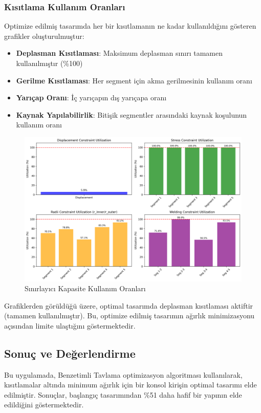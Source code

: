 \subsubsection{Kısıtlama Kullanım Oranları}
Optimize edilmiş tasarımda her bir kısıtlamanın ne kadar kullanıldığını gösteren grafikler oluşturulmuştur:

\begin{itemize}
    \item \textbf{Deplasman Kısıtlaması}: Maksimum deplasman sınırı tamamen kullanılmıştır (\%100)
    \item \textbf{Gerilme Kısıtlaması}: Her segment için akma gerilmesinin kullanım oranı
    \item \textbf{Yarıçap Oranı}: İç yarıçapın dış yarıçapa oranı
    \item \textbf{Kaynak Yapılabilirlik}: Bitişik segmentler arasındaki kaynak koşulunun kullanım oranı
\end{itemize}

\begin{figure}[H]
    \centering
    \includegraphics[width=1\textwidth]{weeks_new/imgs/constraint_utilization.png}
    \caption{Sınırlayıcı Kapasite Kullanım Oranları}
    \label{fig:constraint_utilization}
\end{figure}

Grafiklerden görüldüğü üzere, optimal tasarımda deplasman kısıtlaması aktiftir (tamamen kullanılmıştır). Bu, optimize edilmiş tasarımın ağırlık minimizasyonu açısından limite ulaştığını göstermektedir.

\subsection{Sonuç ve Değerlendirme}
Bu uygulamada, Benzetimli Tavlama optimizasyon algoritması kullanılarak, kısıtlamalar altında minimum ağırlık için bir konsol kirişin optimal tasarımı elde edilmiştir. Sonuçlar, başlangıç tasarımından \%51 daha hafif bir yapının elde edildiğini göstermektedir.

